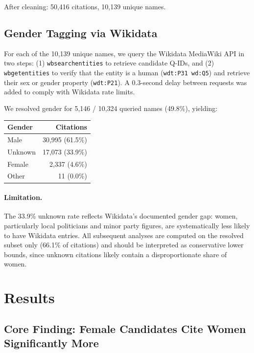 \documentclass{article}
\begin{document}
After cleaning: 50,416 citations, 10,139 unique names.

\subsection{Gender Tagging via Wikidata}

For each of the 10,139 unique names, we query the Wikidata MediaWiki API in two
steps: (1) \texttt{wbsearchentities} to retrieve candidate Q-IDs, and (2)
\texttt{wbgetentities} to verify that the entity is a human
(\texttt{wdt:P31 wd:Q5}) and retrieve their sex or gender property
(\texttt{wdt:P21}). A 0.3-second delay between requests was added to comply with
Wikidata rate limits.

We resolved gender for 5,146 / 10,324 queried names (49.8\%), yielding:

\begin{center}
  \begin{tabular}{lr}
    \toprule
    Gender & Citations \\
    \midrule
    Male    & 30,995 (61.5\%) \\
    Unknown & 17,073 (33.9\%) \\
    Female  &  2,337 (4.6\%)  \\
    Other   &     11 (0.0\%)  \\
    \bottomrule
  \end{tabular}
\end{center}

\paragraph{Limitation.}
The 33.9\% unknown rate reflects Wikidata's documented gender gap: women,
particularly local politicians and minor party figures, are systematically less
likely to have Wikidata entries. All subsequent analyses are computed on the
resolved subset only (66.1\% of citations) and should be interpreted as
conservative lower bounds, since unknown citations likely contain a
disproportionate share of women.


\section{Results}

\subsection{Core Finding: Female Candidates Cite Women Significantly More}
\end{document}
